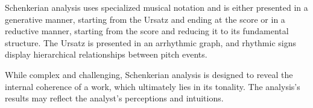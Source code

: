 Schenkerian analysis uses specialized musical notation and is either presented in a generative manner, starting from the Ursatz and ending at the score or in a reductive manner, starting from the score and reducing it to its fundamental structure. The Ursatz is presented in an arrhythmic graph, and rhythmic signs display hierarchical relationships between pitch events.

While complex and challenging, Schenkerian analysis is designed to reveal the internal coherence of a work, which ultimately lies in its tonality. The analysis's results may reflect the analyst's perceptions and intuitions.




